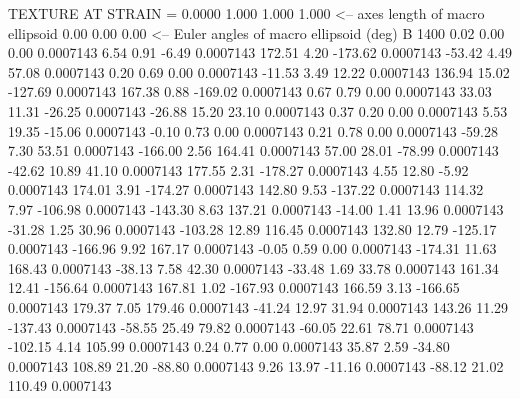 TEXTURE AT STRAIN =    0.0000
   1.000   1.000   1.000  <-- axes length of macro ellipsoid
    0.00    0.00    0.00  <-- Euler angles of macro ellipsoid (deg)
B      1400
        0.02        0.00        0.00     0.0007143
        6.54        0.91       -6.49     0.0007143
      172.51        4.20     -173.62     0.0007143
      -53.42        4.49       57.08     0.0007143
        0.20        0.69        0.00     0.0007143
      -11.53        3.49       12.22     0.0007143
      136.94       15.02     -127.69     0.0007143
      167.38        0.88     -169.02     0.0007143
        0.67        0.79        0.00     0.0007143
       33.03       11.31      -26.25     0.0007143
      -26.88       15.20       23.10     0.0007143
        0.37        0.20        0.00     0.0007143
        5.53       19.35      -15.06     0.0007143
       -0.10        0.73        0.00     0.0007143
        0.21        0.78        0.00     0.0007143
      -59.28        7.30       53.51     0.0007143
     -166.00        2.56      164.41     0.0007143
       57.00       28.01      -78.99     0.0007143
      -42.62       10.89       41.10     0.0007143
      177.55        2.31     -178.27     0.0007143
        4.55       12.80       -5.92     0.0007143
      174.01        3.91     -174.27     0.0007143
      142.80        9.53     -137.22     0.0007143
      114.32        7.97     -106.98     0.0007143
     -143.30        8.63      137.21     0.0007143
      -14.00        1.41       13.96     0.0007143
      -31.28        1.25       30.96     0.0007143
     -103.28       12.89      116.45     0.0007143
      132.80       12.79     -125.17     0.0007143
     -166.96        9.92      167.17     0.0007143
       -0.05        0.59        0.00     0.0007143
     -174.31       11.63      168.43     0.0007143
      -38.13        7.58       42.30     0.0007143
      -33.48        1.69       33.78     0.0007143
      161.34       12.41     -156.64     0.0007143
      167.81        1.02     -167.93     0.0007143
      166.59        3.13     -166.65     0.0007143
      179.37        7.05      179.46     0.0007143
      -41.24       12.97       31.94     0.0007143
      143.26       11.29     -137.43     0.0007143
      -58.55       25.49       79.82     0.0007143
      -60.05       22.61       78.71     0.0007143
     -102.15        4.14      105.99     0.0007143
        0.24        0.77        0.00     0.0007143
       35.87        2.59      -34.80     0.0007143
      108.89       21.20      -88.80     0.0007143
        9.26       13.97      -11.16     0.0007143
      -88.12       21.02      110.49     0.0007143

